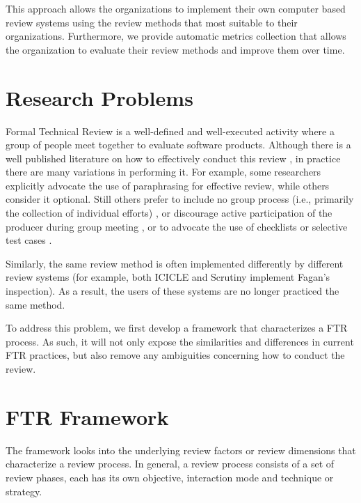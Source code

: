 This approach allows the organizations to implement their own computer
based review systems using the review methods that most suitable to their
organizations. Furthermore, we provide 
automatic metrics collection that allows the organization to
evaluate their review methods and improve them over time.


\section {Research Problems}
Formal Technical Review is a well-defined and well-executed activity
where a group of people meet together to evaluate software products.
Although there is a well published literature on how to
effectively conduct this review \cite{Fagan76}, in
practice there are many variations in performing it.
For example, some researchers
\cite{Fagan76,Russell91} explicitly advocate the use of paraphrasing
for effective review, while others \cite{Humphrey90} consider it
optional. Still others prefer to include no group process (i.e.,
primarily the collection of individual efforts)
\cite{Votta93}, or discourage active participation of the producer
during group meeting \cite{Ackerman89,Russell91},  or to advocate the
use of checklists \cite{Fagan76,Humphrey90,Freedman90} or selective
test cases \cite{Ackerman89,Dunn84}. 

Similarly, the same review method is often 
implemented differently by different review systems (for example, both
ICICLE \cite{Brothers90} and Scrutiny \cite{Gintell93} implement
Fagan's inspection).  As a result, the users of these systems are no
longer practiced the same method.

To address this problem, we first develop a framework that
characterizes a FTR process. As such, it will not only expose the
similarities and differences in current FTR practices, but also remove
any ambiguities concerning how to conduct the review.


\section {FTR Framework}

The framework looks into the underlying review factors or review
dimensions that characterize a review process. In general, a review
process consists of a set of review phases, each has its own
objective, interaction mode and technique or strategy.

